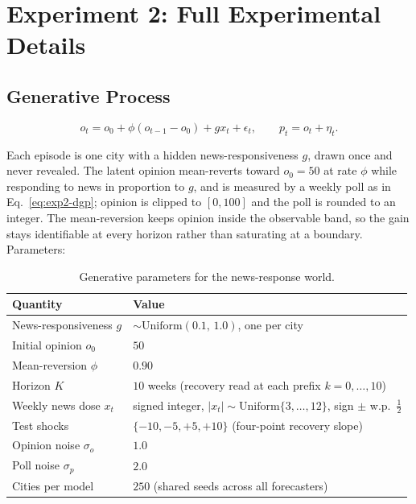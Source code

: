 
\section{Experiment 2: Full Experimental Details}
\label{app:legacy-hidden-structure-details}

\subsection{Generative Process}
\label{app:exp2-dgp}
\begin{equation}
 o_t = o_0 + \phi(o_{t-1}-o_0) + g x_t + \epsilon_t, \qquad p_t=o_t+\eta_t.
\label{eq:exp2-dgp}
\end{equation}

Each episode is one city with a hidden news-responsiveness $g$, drawn once and never
revealed.  The latent opinion mean-reverts toward $o_0=50$ at rate $\phi$ while responding to
news in proportion to $g$, and is measured by a weekly poll as in Eq.~\eqref{eq:exp2-dgp};
opinion is clipped to $[0,100]$ and the poll is rounded to an integer.  The mean-reversion keeps
opinion inside the observable band, so the gain stays identifiable at every horizon rather than
saturating at a boundary.  Parameters:

\begin{table}[h]
\centering
\caption{Generative parameters for the news-response world.}
\label{tab:exp2-params}
\small
\begin{tabular}{ll}
\toprule
\textbf{Quantity} & \textbf{Value} \\
\midrule
News-responsiveness $g$        & $\sim\mathrm{Uniform}(0.1,\,1.0)$, one per city \\
Initial opinion $o_0$          & $50$ \\
Mean-reversion $\phi$          & $0.90$ \\
Horizon $K$                    & $10$ weeks (recovery read at each prefix $k=0,\dots,10$) \\
Weekly news dose $x_t$         & signed integer, $|x_t|\sim\mathrm{Uniform}\{3,\dots,12\}$, sign $\pm$ w.p.\ $\tfrac12$ \\
Test shocks                    & $\{-10,-5,+5,+10\}$ (four-point recovery slope) \\
Opinion noise $\sigma_o$       & $1.0$ \\
Poll noise $\sigma_p$          & $2.0$ \\
Cities per model              & $250$ (shared seeds across all forecasters) \\
\bottomrule
\end{tabular}
\end{table}

